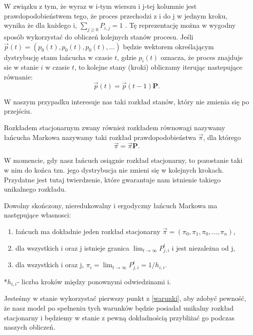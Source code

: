 W związku z tym, że wyraz w i-tym wierszu i j-tej kolumnie jest prawdopodobieństwem tego, że proces przechodzi z i do j w jednym kroku, wynika że dla każdego i, $\sum_{j\ge0} P_{i,j}=1$ \cite{Metodyksiazka}. Tę reprezentację można w wygodny sposób wykorzystać do obliczeń kolejnych stanów procesu. Jeśli $\overrightarrow{p}(t)=(p_0(t),p_0(t),p_0(t),\dots )$  będzie wektorem określającym dystrybucję stanu łańcucha w czasie $t$, gdzie $p_i(t)$ oznacza, że proces znajduje sie w stanie $i$ w czasie $t$, to kolejne stany (kroki) obliczamy iterując nastepujące równanie:
\begin{equation}
    \overrightarrow{p}(t)=\overrightarrow{p}(t-1)\bm{P}.
\end{equation}

W naszym przypadku interesuje nas taki rozkład stanów, który nie zmienia się po przejściu.


\begin{definition}\label{def:stacjonarny}
Rozkładem stacjonarnym zwany również rozkładem równowagi nazywamy łańcucha Markowa nazywamy taki rozkład prawdopodobieństwa $ \overrightarrow{\pi}$, dla którego
\begin{equation*}
    \overrightarrow{\pi} = \overrightarrow{\pi} \bm{P}.
\end{equation*}
\end{definition}

W momencie, gdy nasz łańcuch osiągnie rozkład stacjonarny, to pozostanie taki w nim do końca tzn. jego dystrybucja nie zmieni się w kolejnych krokach. Przydatne jest tutaj twierdzenie, które gwarantuje nam istnienie takiego unikalnego rozkładu.

\begin{definition}
\label{warunki}
Dowolny skończony, nieredukowalny i ergodyczny łańcuch Markowa ma następujące własnosci:
\begin{enumerate}
    \item łańcuch ma dokładnie jeden rozkład stacjonarny  $\overrightarrow{\pi} = (\pi_0,\pi_1,\pi_0,\dots,\pi_n)$,
    \item dla wszystkich i oraz j istnieje granica $\lim_{t \to \infty}P^t_{j,i}$ i jest niezależna od j,
    \item dla wszystkich i oraz j, $\pi_i =\lim_{t \to \infty}P^t_{j,i}=1/h_{i,i}$.
\end{enumerate}
*$h_{i,i}$- liczba kroków między ponownymi odwiedzinami i.
\end{definition}

Jesteśmy w stanie wykorzystać pierwszy punkt z \ref{warunki}, aby zdobyć pewność, że nasz model po spełneniu tych warunków będzie posiadał unikalny rozkład stacjonarny i będziemy w stanie z pewną dokładnością przybliżać go podczas naszych obliczeń.


